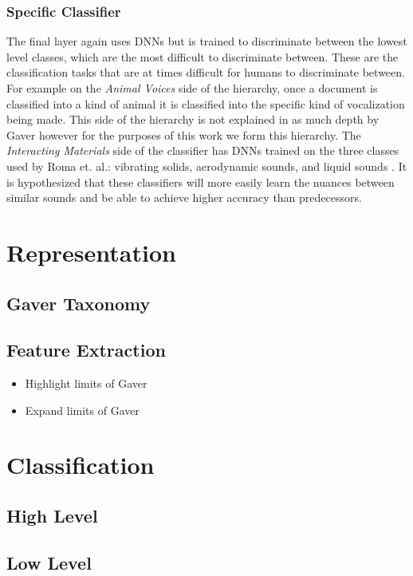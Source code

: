 \subsubsection{Specific Classifier}
The final layer again uses DNNs but is trained to discriminate between the lowest level classes, which are the most difficult to discriminate between. These are the classification tasks that are at times difficult for humans to discriminate between. For example on the \textit{Animal Voices} side of the hierarchy, once a document is classified into a kind of animal it is classified into the specific kind of vocalization being made. This side of the hierarchy is not explained in as much depth by Gaver however for the purposes of this work we form this hierarchy. The \textit{Interacting Materials} side of the classifier has DNNs trained on the three classes used by Roma et. al.: vibrating solids, aerodynamic sounds, and liquid sounds \cite{Roma2010}. It is hypothesized that these classifiers will more easily learn the nuances between similar sounds and be able to achieve higher accuracy than predecessors.

\section{Representation}

\subsection{Gaver Taxonomy}

\subsection{Feature Extraction}
\begin{itemize}
    \item Highlight limits of Gaver
    \item Expand limits of Gaver
\end{itemize}

\section{Classification}
\subsection{High Level}

\subsection{Low Level}


